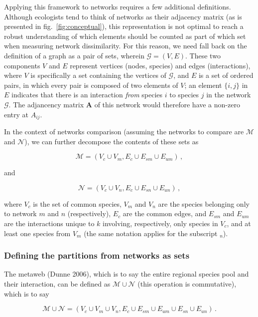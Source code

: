 \documentclass[11pt]{article}
\begin{document}
Applying this framework to networks requires a few additional
definitions. Although ecologists tend to think of networks as their
adjacency matrix (as is presented in fig.~\ref{fig:conceptual}), this
representation is not optimal to reach a robust understanding of which
elements should be counted as part of which set when measuring network
dissimilarity. For this reason, we need fall back on the definition of a
graph as a pair of sets, wherein \(\mathcal{G} = (V, E)\). These two
components \(V\) and \(E\) represent vertices (nodes, species) and edges
(interactions), where \(V\) is specifically a set containing the
vertices of \(\mathcal{G}\), and \(E\) is a set of ordered pairs, in
which every pair is composed of two elements of \(V\); an element
\(\{i,j\}\) in \(E\) indicates that there is an interaction \emph{from}
species \(i\) to species \(j\) in the network \(\mathcal{G}\). The
adjancency matrix \(\mathbf{A}\) of this network would therefore have a
non-zero entry at \(A_{ij}\).

In the context of networks comparison (assuming the networks to compare
are \(\mathcal{M}\) and \(\mathcal{N}\)), we can further decompose the
contents of these sets as

\[\mathcal{M} = (V_c \cup V_m, E_c \cup E_{sm} \cup E_{um}) \,,\]

and

\[\mathcal{N} = (V_c \cup V_n, E_c \cup E_{sn} \cup E_{un}) \,,\]

where \(V_c\) is the set of common species, \(V_m\) and \(V_n\) are the
species belonging only to network \(m\) and \(n\) (respectively),
\(E_c\) are the common edges, and \(E_{sm}\) and \(E_{um}\) are the
interactions unique to \(k\) involving, respectively, only species in
\(V_c\), and at least one species from \(V_m\) (the same notation
applies for the subscript \(_{n}\)).

\hypertarget{defining-the-partitions-from-networks-as-sets}{%
\subsubsection{Defining the partitions from networks as
sets}\label{defining-the-partitions-from-networks-as-sets}}

The metaweb (Dunne 2006), which is to say the entire regional species
pool and their interaction, can be defined as
\(\mathcal{M} \cup \mathcal{N}\) (this operation is commutative), which
is to say

\[\mathcal{M} \cup \mathcal{N} = (V_c \cup V_m \cup V_n, E_c \cup E_{sm} \cup E_{um} \cup E_{sn} \cup E_{un}) \,.\]
\end{document}
